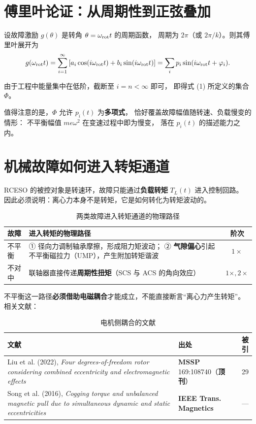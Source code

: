 \documentclass[11pt,a4paper]{ctexart}
\begin{document}
\section{傅里叶论证：从周期性到正弦叠加}
\label{sec:fourier}

设故障激励 $g(\theta)$ 是转角 $\theta=\omega_{\rm rot}t$ 的周期函数，
周期为 $2\pi$（或 $2\pi/k$）。则其傅里叶展开为
\begin{equation}
g(\omega_{\rm rot}t)=\sum_{i=1}^{\infty}\left[a_i\cos(i\omega_{\rm rot}t)+b_i\sin(i\omega_{\rm rot}t)\right]
=\sum_{i}p_i\sin(i\omega_{\rm rot}t+\varphi_i).
\end{equation}

由于工程中能量集中在低阶，截断至 $i=n<\infty$ 即可，
即得式 (1) 所定义的集合 $\Phi$。

值得注意的是，$\Phi$ 允许 $p_i(t)$ 为\textbf{多项式}，
恰好覆盖故障幅值随转速、负载慢变的情形：
不平衡幅值 $me\omega^2$ 在变速过程中即为慢变，
落在 $p_i(t)$ 的描述能力之内。

\section{机械故障如何进入转矩通道}

RCESO 的被控对象是转速环，故障只能通过\textbf{负载转矩} $T_L(t)$ 进入控制回路。
因此必须说明：离心力本身不是转矩，它是如何转化为转矩波动的。

\begin{table}[h]
\centering
\caption{两类故障进入转矩通道的物理路径}
\begin{tabular}{@{}p{2.6cm}p{8.4cm}c@{}}
\toprule
故障 & 进入转矩的物理路径 & 阶次 \\
\midrule
不平衡 &
① 径向力调制轴承摩擦，形成阻力矩波动；\newline
② \textbf{气隙偏心}引起不平衡磁拉力（UMP），产生附加转矩谐波 &
$1\times$ \\
不对中 &
联轴器直接传递\textbf{周期性扭矩}（SCS 与 ACS 的角向效应） &
$1\times,2\times$ \\
\bottomrule
\end{tabular}
\end{table}

不平衡这一路径\textbf{必须借助电磁耦合}才能成立，不能直接断言“离心力产生转矩”。
相关文献：

\begin{table}[h]
\centering
\caption{电机侧耦合的文献}
\small
\begin{tabular}{@{}p{8.2cm}p{3.6cm}r@{}}
\toprule
文献 & 出处 & 被引 \\
\midrule
Liu et al. (2022), \emph{Four degrees-of-freedom rotor considering combined eccentricity and electromagnetic effects}
& \textbf{MSSP} 169:108740（\textbf{顶刊}） & 29 \\
Song et al. (2016), \emph{Cogging torque and unbalanced magnetic pull due to simultaneous dynamic and static eccentricities}
& \textbf{IEEE Trans. Magnetics} & — \\
\bottomrule
\end{tabular}
\end{table}
\end{document}
